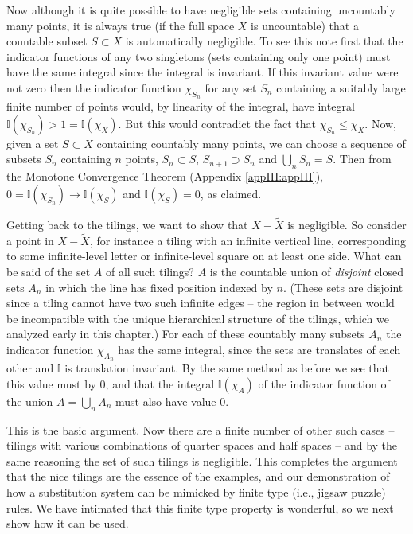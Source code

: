 \documentclass[reqno]{stml-l}
\theoremstyle{plain}
\theoremstyle{definition}
\numberwithin{equation}{chapter}
\begin{document}
Now although it is quite possible to have negligible sets containing uncountably many points, it is always true (if the full space $X$ is
uncountable) that a countable subset $S\subset X$ is automatically negligible. To see this note first that the indicator functions of any two singletons (sets containing only one point) must have the same integral since the integral is invariant. If this invariant value were not zero then the indicator function $\chi_{S_{n}}$ for any set $S_{n}$ containing a suitably large finite number of points would, by linearity of the integral, have integral $\mathbb{I}(\chi_{S_{n}})>1=\mathbb{I}(\chi_{X})$. But this would contradict the fact that $\chi_{S_{n}}\leq\chi_{X}$. Now, given a set $S\subset X$ containing countably many points, we can choose a sequence of subsets $S_{n}$ containing $n$ points, $S_{n}\subset S,\, S_{n+1}\supset S_{n}$ and $\bigcup_{n}S_{n}=S$. Then from the Monotone Convergence Theorem (Appendix \ref{appIII:appIII}), $0=\mathbb{I}(\chi_{S_{n}})\longrightarrow\mathbb{I}(\chi_{S})$
and $\mathbb{I}(\chi_{S})=0$, as claimed.

Getting back to the tilings, we want to show that $X-\tilde{X}$ is negligible. So consider a point in $X-\tilde{X}$, for instance a tiling with an infinite vertical line, corresponding to some infinite-level letter or infinite-level square on at least one side. What can be said of the set $A$ of all such tilings? $A$ is the countable union of \emph{disjoint} closed sets $A_{n}$ in which the line has fixed position indexed by $n$. (These sets are disjoint since a tiling cannot have two such infinite edges -- the region in between would be incompatible with the unique hierarchical structure of the tilings, which we analyzed early in this chapter.) For each of these countably many subsets $A_{n}$ the indicator function $\chi_{A_{n}}$ has the same integral, since the sets are translates of each other and $\mathbb{I}$ is translation invariant. By the same method as before we see that this value must by $0$, and that the integral $\mathbb{I}(\chi_{A})$ of the indicator function of the union $A=\bigcup_{n}A_{n}$ must also have value $0$.

This is the basic argument. Now there are a finite number of other such cases
-- tilings with various combinations of quarter spaces and half spaces -- and by the same reasoning the set of such tilings is negligible. This completes the argument that the nice tilings are the essence of the examples, and our demonstration of how a substitution system can be mimicked by finite type (i.e., jigsaw puzzle) rules. We
have intimated that this finite type property is wonderful, so we next show how it can be used.
\end{document}
